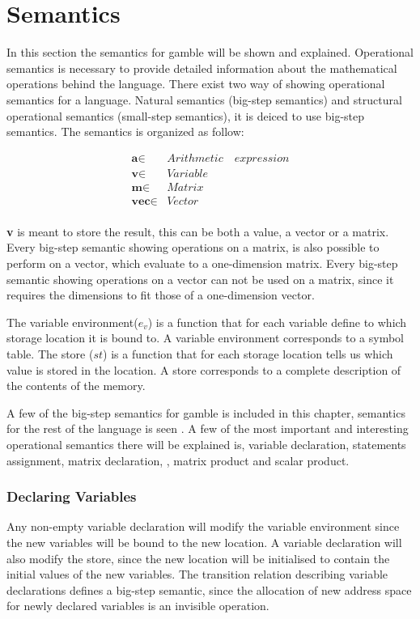 \chapter{Semantics}
In this section the semantics for \gls{gamble} will be shown and explained.
Operational semantics is necessary to provide detailed information about the mathematical operations behind the language.
There exist two way of showing operational semantics for a language.
Natural semantics (big-step semantics) and structural operational semantics (small-step semantics), it is deiced to use big-step semantics.
The semantics is organized as follow:

\begin{align*}
	\textbf{a} \in  &Arithmetic\quad expression\\
	\textbf{v} \in  &Variable\\
	\textbf{m} \in  &Matrix\\
	\textbf{vec} \in  &Vector\\
\end{align*}

\textbf{v} is meant to store the result, this can be both a value, a vector or a matrix.
Every big-step semantic showing operations on a matrix, is also possible to perform on a vector, which evaluate to a one-dimension matrix.
Every big-step semantic showing operations on a vector can not be used on a matrix, since it requires the dimensions to fit those of a one-dimension vector.

The variable environment(${ e }_{ v }$) is a function that for each variable define to which storage location it is bound to. A variable environment corresponds to a symbol table.
The store ($st$) is a function that for each storage location tells us which value is stored in the location. A store corresponds to a complete description of the contents of the memory.\citep{EnvSt_Semantics}

A few of the big-step semantics for \gls{gamble} is included in this chapter, semantics for the rest of the language is seen .
A few of the most important and interesting operational semantics there will be explained is, variable declaration, statements assignment, matrix declaration, , matrix product and scalar product.

\subsection*{Declaring Variables}
Any non-empty variable declaration will modify the variable environment since the new variables will be bound to the new location.
A variable declaration will also modify the store, since the new location will be initialised to contain the initial values of the new variables.
The transition relation describing variable declarations defines a big-step semantic, since the allocation of new address space for newly declared variables is an invisible operation.

